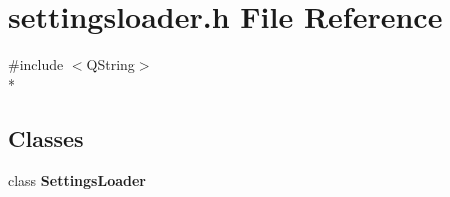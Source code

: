 \section{settingsloader.\+h File Reference}
\label{properties_2settingsloader_8h}
{\ttfamily \#include $<$Q\+String$>$}\\*
\subsection*{Classes}
\begin{DoxyCompactItemize}
\item 
class {\bf Settings\+Loader}
\end{DoxyCompactItemize}
